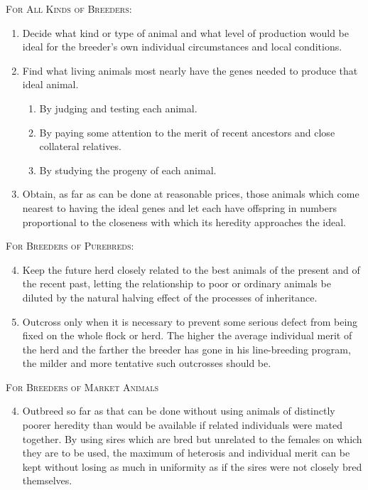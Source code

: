 \noindent
\textsc{For All Kinds of Breeders:}
\begin{enumerate}
	\item Decide what kind or type of animal and what level of production
	would be ideal for the breeder's own individual circumstances and
	local conditions.
	\item Find what living animals most nearly have the genes needed to produce
	that ideal animal.
	\begin{enumerate}
		\item By judging and testing each animal.
		\item By paying some attention to the merit of recent ancestors and
		close collateral relatives.
		\item By studying the progeny of each animal.
	\end{enumerate}
	\item Obtain, as far as can be done at reasonable prices, those animals
	which come nearest to having the ideal genes and let each have offspring
	in numbers proportional to the closeness with which its heredity approaches
	the ideal.
\end{enumerate}

\begin{multicols}{2}
	\noindent \textsc{For Breeders of Purebreds:}
	\begin{enumerate}
		\setcounter{enumi}{3}
		\item Keep the future herd closely related to the best animals of the present and of the recent past, letting the relationship to poor or ordinary animals be diluted by the natural halving effect of the processes of inheritance.
		\item Outcross only when it is necessary to prevent some serious defect from being fixed on the whole flock or herd. The higher the average individual merit of the herd and the farther the	breeder has gone in his line-breeding program, the milder and more tentative such outcrosses should be.
	\end{enumerate}
	\columnbreak

	\noindent \textsc{For Breeders of Market Animals}
	\begin{enumerate}
		\setcounter{enumi}{3}
		\item Outbreed so far as that can be done without using animals of distinctly poorer heredity than would be available if related individuals were mated together. By using sires which are bred but unrelated to the females on which they are to be used, the maximum of heterosis and individual merit can be kept without losing as much in uniformity as if the sires were not closely bred themselves.
	\end{enumerate}
\end{multicols}

